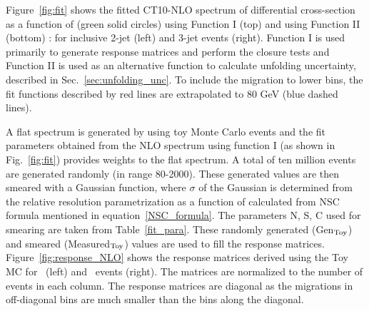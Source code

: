 Figure~\ref{fig:fit} shows the fitted CT10-NLO spectrum of differential cross-section as a function of \httwo (green solid circles) using Function I (top) and using Function II (bottom) : for inclusive 2-jet (left) and 3-jet events (right). Function I is used primarily to generate response matrices and perform the closure tests and Function II is used as an alternative function to calculate unfolding uncertainty, described in Sec.~\ref{sec:unfolding_unc}. To include the migration to lower bins, the fit functions described by red lines are extrapolated to 80 GeV (blue dashed lines).

A flat \httwo spectrum is generated by using toy Monte Carlo events and the fit parameters obtained from the NLO spectrum using function I (as shown in Fig.~\ref{fig:fit}) provides weights to the flat spectrum. A total of ten million events are generated randomly (in \httwo range 80-2000). These generated values are then smeared with a Gaussian function, where $\sigma$ of the Gaussian is determined from the relative resolution parametrization as a function of \httwo calculated from NSC formula mentioned in equation~\ref{NSC_formula}. The parameters N, S, C used for smearing are taken from Table~\ref{fit_para}. These randomly generated (Gen$_{\rm Toy}$) and smeared (Measured$_{\rm Toy}$) values are used to fill the response matrices. Figure~\ref{fig:response_NLO} shows the response matrices derived using the Toy MC for \njt~(left) and \njth~events (right). The matrices are normalized to the number of events in each column. The response matrices are diagonal as the migrations in off-diagonal bins are much smaller than the bins along the diagonal.

